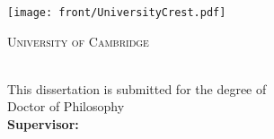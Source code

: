 
\begin{titlingpage}
\begin{center}
\texttt{[image: front/UniversityCrest.pdf]}
\par\vspace{0.25cm}
{\scshape\LARGE University of Cambridge\par}
{\scshape\Large \college\par}
\vspace{2cm}
{\huge\bfseries\thesistitle\par}
\vspace{1.25cm}
{\huge \myname}\\
\vspace{2.5cm}
This dissertation is submitted for the degree of\\\large{Doctor of Philosophy}\\
\vfill
{\large \textbf{Supervisor:} \supervisor}\\
\vspace{1cm}
{\submissiondate{}}
\end{center}
\end{titlingpage}